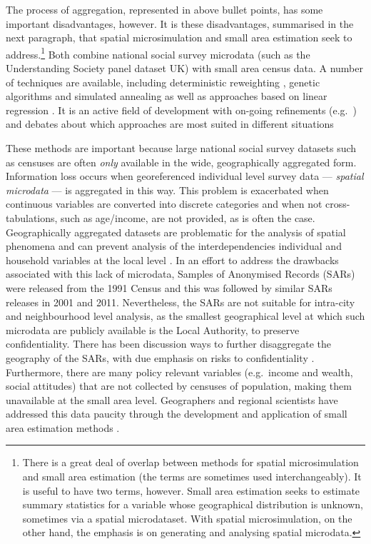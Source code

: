 \documentclass[a4paper,10pt]{article}
\begin{document}
The process of aggregation, represented in above bullet points,
has some important disadvantages, however. It is these disadvantages,
summarised in the next paragraph, that spatial microsimulation and small
area estimation seek to address.\footnote{There
is a great deal of overlap between methods for spatial microsimulation and
small area estimation (the terms are sometimes used 
interchangeably). It is useful
to have two terms, however. Small
area estimation seeks to estimate summary statistics for a variable whose
geographical distribution is unknown, sometimes via a spatial microdataset. With spatial
microsimulation, on the other hand, the emphasis is on generating and analysing
spatial microdata.}
Both combine national social survey microdata
(such as the Understanding Society panel dataset UK) with small area census data.
A number of techniques are available, including
deterministic reweighting \citep{Birkin1989a},
genetic algorithms and simulated annealing \citep{Williamson1998}
as well as approaches based on linear regression \citep{Harding2011}.
It is an active field of development with on-going refinements
(e.g.~\citep{Lovelace2013-trs,Pritchard2012}) and debates
about which approaches are most suited in different situations
\citep{harland2012,Hermes2012a,Smith2009,whitworth2013evaluations,Williamson2013}

These methods are important because large national social survey datasets 
such as censuses are often \emph{only} available in the wide, geographically aggregated
form. Information loss occurs when georeferenced individual level survey data
--- \emph{spatial microdata} --- is aggregated in this way. This
problem is exacerbated when continuous variables
are converted into discrete categories and 
when not cross-tabulations, such as age/income, are not provided, as is often the case.
Geographically aggregated datasets are
problematic for the analysis of spatial phenomena \citep{Openshaw1984}
and can prevent analysis of the interdependencies individual and household variables
at the local level \citep{Lee2009}.
In an effort to address the drawbacks associated with this lack of microdata,
Samples of Anonymised Records (SARs) were released from the 1991 Census
\citep{dale1993census,middleton1995samples} and this was followed by similar SARs releases in 2001 and 2011.
Nevertheless, the SARs are not suitable for intra-city and neighbourhood level
analysis, as the smallest geographical level at which such microdata are publicly
available is the Local Authority, to preserve confidentiality.
There has been discussion ways to further disaggregate the geography
of the SARs, with due emphasis on risks to confidentiality \citep{Tranmer2005case4}.
Furthermore, there are many policy relevant variables (e.g.~income and wealth, social attitudes)
that are not collected by censuses of population, making them unavailable at the small area level.
Geographers and regional scientists have addressed this data paucity through the development
and application of small area estimation methods \citep{Ballas2005c,Hermes2012a}.
\end{document}
